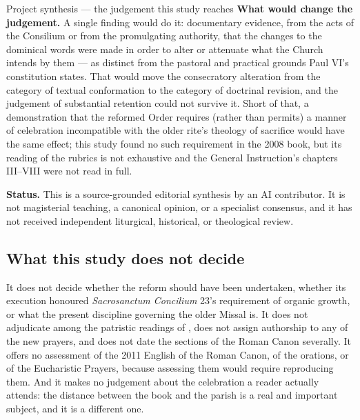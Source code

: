 \begin{studybox}{Project synthesis --- the judgement this study reaches}
\smallskip
\textbf{What would change the judgement.} A single finding would do it: documentary evidence,
from the acts of the Consilium or from the promulgating authority, that the changes to the
dominical words were made in order to alter or attenuate what the Church intends by them --- as
distinct from the pastoral and practical grounds Paul VI's constitution states. That would move
the consecratory alteration from the category of textual conformation to the category of
doctrinal revision, and the judgement of substantial retention could not survive it. Short of
that, a demonstration that the reformed Order requires (rather than permits) a manner of
celebration incompatible with the older rite's theology of sacrifice would have the same effect;
this study found no such requirement in the 2008 book, but its reading of the rubrics is not
exhaustive and the General Instruction's chapters III--VIII were not read in full.

\smallskip
\textbf{Status.} This is a source-grounded editorial synthesis by an AI contributor. It is not
magisterial teaching, a canonical opinion, or a specialist consensus, and it has not received
independent liturgical, historical, or theological review.
\end{studybox}

\subsection{What this study does not decide}

It does not decide whether the reform should have been undertaken, whether its execution
honoured \emph{Sacrosanctum Concilium} 23's requirement of organic growth, or what the present
discipline governing the older Missal is. It does not adjudicate among the patristic readings of
, does not assign authorship to any of the new prayers, and does not
date the sections of the Roman Canon severally. It offers no assessment of the 2011 English of
the Roman Canon, of the orations, or of the Eucharistic Prayers, because assessing them would
require reproducing them. And it makes no judgement about the celebration a reader actually
attends: the distance between the book and the parish is a real and important subject, and it is
a different one.
